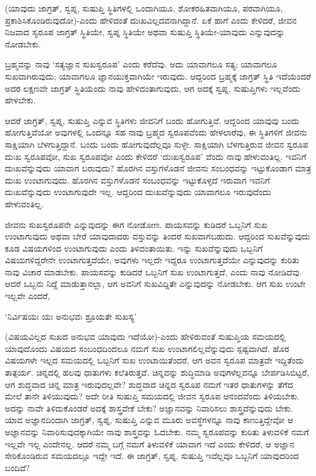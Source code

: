 (ಯಾವುದು ಜಾಗ್ರತ್, ಸ್ವಪ್ನ, ಸುಷುಪ್ತಿ ಸ್ಥಿತಿಗಳಲ್ಲಿ ಒಂದಾಗಿಯೂ, ಶೋಕರಹಿತವಾಗಿಯೂ, ಪರವಾಗಿಯೂ, ಪ್ರಕಾಶಿಸಿಕೊಂಡಿರುವುದೋ)-ಎಂದು ಹೇಳಿದಂತೆ ದುಃಖವಿಲ್ಲದವನಾಗಿದ್ದಾನೆ. ಏಕೆ ಹಾಗೆ ಎಂದು ಕೇಳಿದರೆ, ಜೀವನ ನಿಜವಾದ ಸ್ವರೂಪ ಜಾಗ್ರತ್ ಸ್ಥಿತಿಯೇ, ಸ್ವಪ್ನ ಸ್ಥಿತಿಯೇ ಅಥವಾ ಸುಷುಪ್ತಿ ಸ್ಥಿತಿಯೇ-ಯಾವುದು ಎನ್ನುವುದನ್ನು ನೋಡಬೇಕು.

ಬ್ರಹ್ಮವನ್ನು ನಾವು `ಸತ್ಯಜ್ಞಾನ ಸುಖಸ್ವರೂಪ' ಎಂದು ಕರೆದೆವು. ಅದು ಯಾವಾಗಲೂ ಸತ್ಯ; ಯಾವಾಗಲೂ ಸುಖವಾಗಿರುವುದು; ಯಾವಾಗಲೂ ಜ್ಞಾನಯುಕ್ತವಾಗಿಯೇ ಇರುವುದು. ಆದ್ದರಿಂದ ಬ್ರಹ್ಮಕ್ಕೆ ಜಾಗ್ರತ್ ಸ್ಥಿತಿ ಇದೆಯೆಂದರೆ ಅದರ ಲಕ್ಷಣವೇ ಜಾಗ್ರತ್ ಸ್ಥಿತಿಯೆಂದು ನಾವು ಹೇಳಿದಂತಾಗುವುದು, ಆಗ ಅದಕ್ಕೆ ಸ್ವಪ್ನ, ಸುಷುಪ್ತಿಗಳು ಇಲ್ಲವೆಂದು ಹೇಳಬೇಕು.

ಆದರೆ ಜಾಗ್ರತ್, ಸ್ವಪ್ನ, ಸುಷುಪ್ತಿ ಎನ್ನುವ ಸ್ಥಿತಿಗಳು ಜೀವನಿಗೆ ಬಂದು ಹೋಗುತ್ತಿವೆ. ಆದ್ದರಿಂದ ಯಾವುವು ಬಂದು ಹೋಗುತ್ತಿವೆಯೋ ಅವುಗಳಲ್ಲಿ ಒಂದನ್ನೂ ಸಹ ನಾವು ಬ್ರಹ್ಮದ ಸ್ವರೂಪವೆಂದು ಹೇಳಲಾರೆವು, ಈ ಸ್ಥಿತಿಗಳಿಗೆ ಜೀವನು ಸಾಕ್ಷಿಯಾಗಿ ಬೆಳಗುತ್ತಿದ್ದಾನೆ. ಬಂದು ಬಂದು ಹೋಗುವುದೆಲ್ಲವೂ ಸುಳ್ಳೇ. ಸಾಕ್ಷಿಯಾಗಿ ಬೆಳಗುತ್ತಿರುವ ಜೀವನ ಸ್ವರೂಪ ದುಃಖ ಸ್ವರೂಪವೋ, ಸುಖ ಸ್ವರೂಪವೋ ಎಂದು ಕೇಳಿದರೆ `ದುಃಖಸ್ವರೂಪ' ವೆಂದು ನಾವು ಹೇಳುವಂತಿಲ್ಲ. ಇವನಿಗೆ ದುಃಖವೆನ್ನುವುದು ಯಾವಾಗ ಬರುವುದು? ಹೊರಗಿನ ವಸ್ತುಗಳೊಡನೆ ಜೀವನು ಸಂಬಂಧವನ್ನು ಇಟ್ಟುಕೊಂಡಾಗ ಮಾತ್ರ ದುಃಖ ಉಂಟಾಗುವುದು. ಹೊರಗಿನ ವಸ್ತುಗಳೊಡನೆ ಸಂಬಂಧವನ್ನು ಇಟ್ಟುಕೊಳ್ಳದೆ ಇರುವಾಗ ಇವನಿಗೆ ದುಃಖವೆನ್ನುವುದು ಉಂಟಾಗುವುದೇ ಇಲ್ಲ. ಆದ್ದರಿಂದ ದುಃಖವೆನ್ನುವುದು ಯಾವಾಗಲೂ ಇರುವುದೆಂದು ಹೇಳುವಂತಿಲ್ಲ.

ಜೀವನು ಸುಖಸ್ವರೂಪನೇ ಎನ್ನುವುದನ್ನು ಈಗ ನೋಡೋಣ. ಪಾಯಸವನ್ನು ಕುಡಿದರೆ ಒಬ್ಬನಿಗೆ ಸುಖ ಉಂಟಾಗುವುದು ಅಥವಾ ಬೇರೆ ಯಾವುದಾದರು ವಸ್ತುವನ್ನು ತಿಂದರೆ ಸುಖವಾಗಬಹುದು. ಆದ್ದರಿಂದ ಸುಖವೆನ್ನುವುದು ಕೂಡ ವಿಷಯಗಳಿಂದ ಉಂಟಾಗುವುದು ಎಂದು ತಿಳಿದಂತಾಯಿತು. ಇನ್ನು ಸುಖವೆನ್ನುವುದು ಒಬ್ಬನಿಗೆ ವಿಷಯಗಳಿದ್ದರೇನೇ ಉಂಟಾಗುತ್ತದೆಯೇ, ಅವುಗಳು ಇಲ್ಲದೇ ಇದ್ದರೂ ಉಂಟಾಗುತ್ತದೆಯೇ ಎನ್ನುವುದನ್ನು ಕುರಿತು ನಾವು ವಿಚಾರ ಮಾಡಬೇಕು. ಪಾಯಸವನ್ನು ಕುಡಿದರೆ ಒಬ್ಬನಿಗೆ ಸುಖ ಉಂಟಾಗುತ್ತದೆ, ಎಂದು ನಾವು ನೋಡಿದೆವು. ಆದರೆ ಒಬ್ಬನು ನಿದ್ದೆ ಮಾಡುತ್ತಾನಲ್ಲಾ, ಆಗ ಅವನಿಗೆ ಸುಖವಿದ್ದಿತೇ ಎನ್ನುವುದನ್ನು ನೋಡಬೇಕು. ಆಗ ಸುಖ ಉಂಟೇ ಇಲ್ಲವೇ ಎಂದರೆ,

\begin{shloka}
`ನಿರ್ವಿಷಯಃ ಯಃ ಅನುಭವಃ ಶ್ರೂಯತೇ ಸುಖಸ್ಯ'
\end{shloka}

(ವಿಷಯವಿಲ್ಲದ ಸುಖದ ಅನುಭವ ಯಾವುದು ಇದೆಯೋ)-ಎಂದು ಹೇಳಿರುವಂತೆ ಸುಷುಪ್ತಿಯ ಸಮಯದಲ್ಲಿ ಯಾವುದೊಂದು ವಿಷಯದ ಸಂಬಂಧದಿಂದಲೂ ನಮಗೆ ಸುಖ ಉಂಟಾಗಲಿಲ್ಲವೆನ್ನುವುದು ಸ್ಪಷ್ಟವಾಗಿದೆ. ಹೊರ ವಿಷಯಗಳೇ ಇಲ್ಲದ ಸಮಯದಲ್ಲಿ ಒಬ್ಬನಿಗೆ ಸುಖ ಉಂಟಾಯಿತೆಂದರೆ, ಆಗ ಅವನ ಸ್ವರೂಪ ಮಾತ್ರವೇ ಇದ್ದಿತೆಂದು ತಾತ್ಪರ್ಯ. ಚಿನ್ನದಲ್ಲಿ ಹಲವು ಧಾತುಗಳು ಕಲೆತಿರುತ್ತವೆ. ಚಿನ್ನವನ್ನು ಶುದ್ಧಿಮಾಡಿ ಅವುಗಳೆಲ್ಲವನ್ನೂ ಬೇರ್ಪಡಿಸಿಬಿಟ್ಟರೆ, ಆಗ ಶುದ್ಧವಾದ ಚಿನ್ನ ಮಾತ್ರ ಇರುವುದಲ್ಲವೇ? ಶುದ್ಧವಾದ ಚಿನ್ನದ ಸ್ವರೂಪ ನಮಗೆ ಇತರ ಧಾತುಗಳನ್ನು ತೆಗೆದ ಮೇಲೆ ತಾನೇ ತಿಳಿಯುವುದು? ಅದೇ ರೀತಿ ಸುಷುಪ್ತಿ ಸಮಯದಲ್ಲಿ ಜೀವನ ಸ್ವರೂಪ ಆನಂದವೆಂದು ತಿಳಿಯಬೇಕು. ಅದನ್ನು ನಾವೇ ತಿಳಿದುಕೊಂಡರೆ ಅದಕ್ಕೆ ಶಾಸ್ತ್ರವೇಕೆ ಬೇಕು? ಅಜ್ಞಾನವನ್ನು ನಿವಾರಿಸಲು ಶಾಸ್ತ್ರವೆನ್ನುವುದು ಬೇಕು. ಯಾವ ಅಜ್ಞಾನದಿಂದಾಗಿ ಜಾಗ್ರತ್, ಸ್ವಪ್ನ, ಸುಷುಪ್ತಿ ಎನ್ನುವ ಮೂರು ಅವಸ್ಥೆಗಳನ್ನೂ ನಾವು ಕಾಣುತ್ತಿದ್ದೇವೋ ಆ ಅಜ್ಞಾನವನ್ನು ನಿವಾರಿಸುವುದಕ್ಕಾಗಿಯೇ ನಾವು ಶಾಸ್ತ್ರವನ್ನು ಓದಬೇಕು. ನಮ್ಮ ಸ್ವರೂಪವನ್ನು ಕುರಿತು ತಿಳುವಳಿಕೆ ನಮಗೆ ಇಲ್ಲವೇ ಇಲ್ಲ ಎಂದೇನಲ್ಲ. ಆದರೆ ನಮ್ಮ ಬಗ್ಗೆ ನಮಗೆ ತಿಳುವಳಿಕೆ ಯಾವಾಗ ಇದೆ ಎಂದು ಕೇಳಿದರೆ, ಆ ಅಜ್ಞಾನ ಸೇರಿಕೊಂಡಿರುವ ಸಮಯದಲ್ಲೂ ಇದ್ದೇ ಇದೆ. ಈ ಜಾಗ್ರತ್, ಸ್ವಪ್ನ, ಸುಷುಪ್ತಿ ಇವೆಲ್ಲವೂ ಒಬ್ಬನಿಗೆ ಯಾವುದರಿಂದ ಬಂದಿವೆ?

